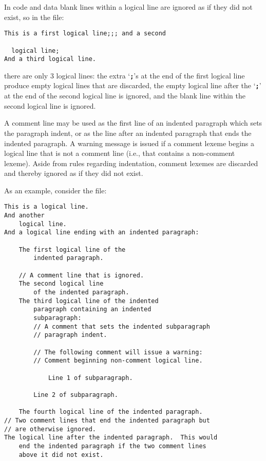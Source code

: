 \documentclass[12pt]{article}
\newcommand{\TT}[1]{{\tt \bfseries #1}}
\newenvironment{indpar}[1][0.3in]%
	{\begin{list}{}%
		     {\setlength{\itemsep}{0in}%
		      \setlength{\topsep}{0in}%
		      \setlength{\parsep}{1ex}%
		      \setlength{\labelwidth}{#1}%
		      \setlength{\leftmargin}{#1}%
		      \addtolength{\leftmargin}{\labelsep}}%
	 \item}%
	{\end{list}}
\begin{document}
In code and data blank lines within a logical line
are ignored
as if they did not exist, so in the file:
\begin{indpar}\begin{verbatim}
This is a first logical line;;; and a second

  logical line;
And a third logical line.
\end{verbatim}\end{indpar}
there are only 3 logical lines: the extra `\TT{;}'s at the
end of the first logical line produce empty logical lines that
are discarded, the empty logical line after the `\TT{;}' at the
end of the second logical line is ignored, and the blank line within
the second logical line is ignored.

A comment
line may be used as the first line of an indented paragraph which sets
the paragraph indent, or as the line after an indented paragraph that
ends the indented paragraph.
A warning message is issued if a comment lexeme begins a logical
line that is not a comment line (i.e., that contains a non-comment
lexeme).
Aside from rules regarding indentation,
comment lexemes are discarded and thereby ignored as if they did not exist.


As an example, consider the file:

\begin{indpar}\begin{verbatim}
This is a logical line.
And another
    logical line.
And a logical line ending with an indented paragraph:

    The first logical line of the
        indented paragraph.

    // A comment line that is ignored.
    The second logical line
        of the indented paragraph.
    The third logical line of the indented
        paragraph containing an indented
        subparagraph:
        // A comment that sets the indented subparagraph
        // paragraph indent.

        // The following comment will issue a warning:
        // Comment beginning non-comment logical line.

            Line 1 of subparagraph.

        Line 2 of subparagraph.

    The fourth logical line of the indented paragraph.
// Two comment lines that end the indented paragraph but
// are otherwise ignored.
The logical line after the indented paragraph.  This would
    end the indented paragraph if the two comment lines
    above it did not exist.
\end{verbatim}\end{indpar}
\end{document}
